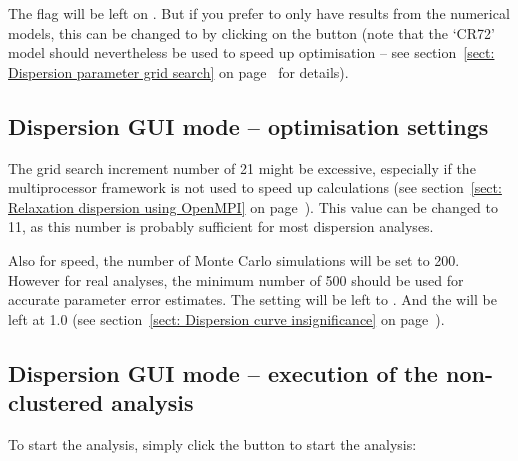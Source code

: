 The  flag will be left on .
But if you prefer to only have results from the numerical models, this can be changed to  by clicking on the  button (note that the `CR72' model should nevertheless be used to speed up optimisation -- see section~\ref{sect: Dispersion parameter grid search} on page~\pageref{sect: Dispersion parameter grid search} for details).



\subsection{Dispersion GUI mode -- optimisation settings}

The grid search increment number of 21 might be excessive, especially if the multiprocessor framework is not used to speed up calculations (see section~\ref{sect: Relaxation dispersion using OpenMPI} on page~\pageref{sect: Relaxation dispersion using OpenMPI}).
This value can be changed to 11, as this number is probably sufficient for most dispersion analyses.

Also for speed, the number of Monte Carlo simulations will be set to 200.
However for real analyses, the minimum number of 500 should be used for accurate parameter error estimates.
The  setting will be left to .
And the  will be left at 1.0 (see section~\ref{sect: Dispersion curve insignificance} on page~\pageref{sect: Dispersion curve insignificance}).



\subsection{Dispersion GUI mode -- execution of the non-clustered analysis}

To start the analysis, simply click the  button to start the analysis:

